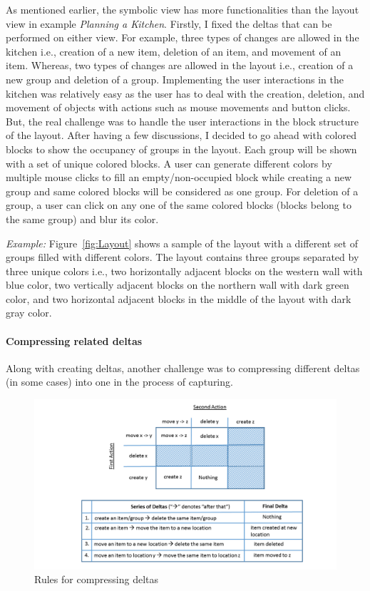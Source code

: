 As mentioned earlier, the symbolic view has more functionalities than the layout view in example \textit{Planning a Kitchen}. Firstly, I fixed the deltas that can be performed on either view. For example, three types of changes are allowed in the kitchen i.e., creation of a new item, deletion of an item, and movement of an item. Whereas, two types of changes are allowed in the layout i.e., creation of a new group and deletion of a group. Implementing the user interactions in the kitchen was relatively easy as the user has to deal with the creation, deletion, and movement of objects with actions such as mouse movements and button clicks. But, the real challenge was to handle the user interactions in the block structure of the layout. After having a few discussions, I decided to go ahead with colored blocks to show the occupancy of groups in the layout. Each group will be shown with a set of unique colored blocks. A user can generate different colors by multiple mouse clicks to fill an empty/non-occupied block while creating a new group and same colored blocks will be considered as one group. For deletion of a group, a user can click on any one of the same colored blocks (blocks belong to the same group) and blur its color. 

\textit{Example:} Figure~\ref{fig:Layout} shows a sample of the layout with a different set of groups filled with different colors. The layout contains three groups separated by three unique colors i.e., two horizontally adjacent blocks on the western wall with {\color{blue} blue} color, two vertically adjacent blocks on the northern wall with {\color{darkgreen} dark green} color, and two horizontal adjacent blocks in the middle of the layout with {\color{darkgray} dark gray} color.

\paragraph{Compressing related deltas}
Along with creating deltas, another challenge was to compressing different deltas (in some cases) into one in the process of capturing. 

\begin{figure}[h]
	\centering
	\includegraphics[width=1\textwidth]{figures/seriesofdeltas}
	\caption{Rules for compressing deltas}
	\label{fig:seriesofdeltas}
\end{figure}

